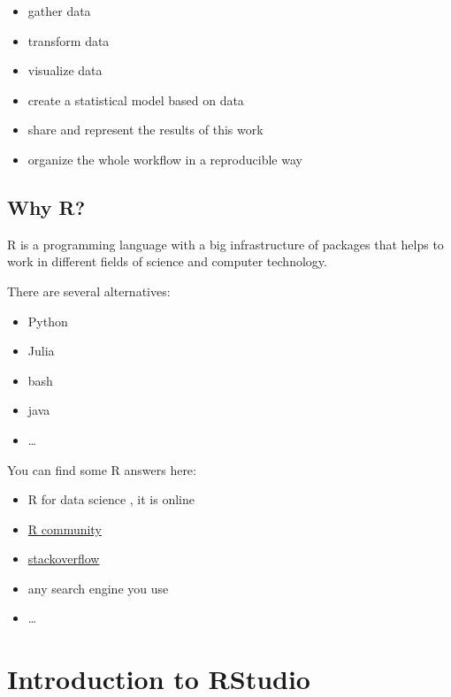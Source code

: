 \documentclass[
]{book}
\providecommand{\tightlist}{%
  \setlength{\itemsep}{0pt}\setlength{\parskip}{0pt}}
\begin{document}
\begin{itemize}
\tightlist
\item
  gather data
\item
  transform data
\item
  visualize data
\item
  create a statistical model based on data
\item
  share and represent the results of this work
\item
  organize the whole workflow in a reproducible way
\end{itemize}

\hypertarget{why-r}{%
\subsection{Why R?}\label{why-r}}

R \citep{r19} is a programming language with a big infrastructure of packages that helps to work in different fields of science and computer technology.

There are several alternatives:

\begin{itemize}
\tightlist
\item
  Python \citep{vanderplas16, grus19}
\item
  Julia \citep{bezanson17}
\item
  bash \citep{janssens14}
\item
  java \citep{brzustowicz17}
\item
  \ldots{}
\end{itemize}

You can find some R answers here:

\begin{itemize}
\tightlist
\item
  R for data science \citep{wickham16}, it is online
\item
  \href{https://community.rstudio.com/}{R community}
\item
  \href{https://stackoverflow.com}{stackoverflow}
\item
  any search engine you use
\item
  \ldots{}
\end{itemize}

\hypertarget{introduction-to-rstudio}{%
\section{Introduction to RStudio}\label{introduction-to-rstudio}}
\end{document}
